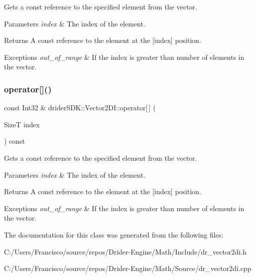 Gets a const reference to the specified element from the vector.


\begin{DoxyParams}{Parameters}
{\em index} & The index of the element.\\
\hline
\end{DoxyParams}
\begin{DoxyReturn}{Returns}
A const reference to the element at the \mbox{[}index\mbox{]} position.
\end{DoxyReturn}

\begin{DoxyExceptions}{Exceptions}
{\em out\+\_\+of\+\_\+range} & If the index is greater than number of elements in the vector. \\
\hline
\end{DoxyExceptions}
\mbox{\label{classdrider_s_d_k_1_1_vector2_d_i_ad842c5082bbdfbc017fcfac8240197bb}} 
\subsubsection{\texorpdfstring{operator[]()}{operator[]()}\hspace{0.1cm}{\footnotesize\ttfamily [2/2]}}
{\footnotesize\ttfamily const Int32 \& drider\+S\+D\+K\+::\+Vector2\+D\+I\+::operator\mbox{[}$\,$\mbox{]} (\begin{DoxyParamCaption}\item[{SizeT}]{index }\end{DoxyParamCaption}) const}

Gets a const reference to the specified element from the vector.


\begin{DoxyParams}{Parameters}
{\em index} & The index of the element.\\
\hline
\end{DoxyParams}
\begin{DoxyReturn}{Returns}
A const reference to the element at the \mbox{[}index\mbox{]} position.
\end{DoxyReturn}

\begin{DoxyExceptions}{Exceptions}
{\em out\+\_\+of\+\_\+range} & If the index is greater than number of elements in the vector. \\
\hline
\end{DoxyExceptions}


The documentation for this class was generated from the following files\+:\begin{DoxyCompactItemize}
\item 
C\+:/\+Users/\+Francisco/source/repos/\+Drider-\/\+Engine/\+Math/\+Include/dr\+\_\+vector2di.\+h\item 
C\+:/\+Users/\+Francisco/source/repos/\+Drider-\/\+Engine/\+Math/\+Source/dr\+\_\+vector2di.\+cpp\end{DoxyCompactItemize}

